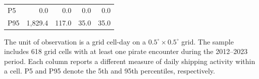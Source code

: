 \begin{table}
\begin{threeparttable}
\begin{tabular}[t]{lrrrr}
\hspace{1em}P5 & 0.0 & 0.0 & 0.0 & 0.0\\
\hspace{1em}P95 & 1,829.4 & 117.0 & 35.0 & 35.0\\
\bottomrule
\end{tabular}
\begin{tablenotes}
\item \scriptsize The unit of observation is a grid cell-day on a $0.5^{\circ} \times 0.5^{\circ}$ grid. The sample includes 618 grid cells with at least one pirate encounter during the 2012--2023 period. Each column reports a different measure of daily shipping activity within a cell. P5 and P95 denote the 5th and 95th percentiles, respectively.
\end{tablenotes}
\end{threeparttable}
\end{table}
